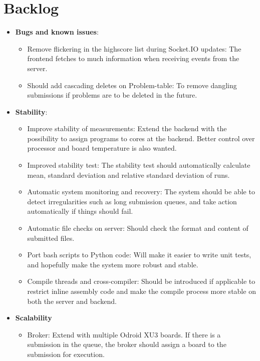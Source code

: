 \chapter{Backlog}
\label{apdx:backlog}

\begin{itemize}
\item \textbf{Bugs and known issues}:
    \begin{itemize}
      \item Remove flickering in the highscore list during Socket.IO updates: The frontend fetches to much information when receiving events from the server.
      \item Should add cascading deletes on Problem-table: To remove dangling submissions if problems are to be deleted in the future.
    \end{itemize}
\item \textbf{Stability}:
    \begin{itemize}
        \item Improve stability of measurements: Extend the backend with the possibility to assign programs to cores at the backend. Better control over processor and board temperature is also wanted.
        \item Improved stability test: The stability test should automatically calculate mean, standard deviation and relative standard deviation of runs.
        \item Automatic system monitoring and recovery: The system should be able to detect irregularities such as long submission queues, and take action automatically if things should fail.
        \item Automatic file checks on server: Should check the format and content of submitted files.
        \item Port bash scripts to Python code: Will make it easier to write unit tests, and hopefully make the system more robust and stable.
        \item Compile threads and cross-compiler: Should be introduced if applicable to restrict inline assembly code and make the compile process more stable on both the server and backend.
    \end{itemize}
\item \textbf{Scalability}
    \begin{itemize}
        \item Broker: Extend with multiple Odroid XU3 boards. If there is a submission in the queue, the broker should assign a board to the submission for execution.

\end{itemize}
\end{itemize}
